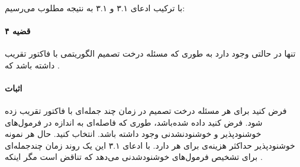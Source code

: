 \documentclass[a4paper]{article}
\begin{document}
	\paragraph{}
	با ترکیب ادعای ۳.۱ و ۳.۱ به نتیجه مطلوب می‌رسیم:
	\paragraph{قضیه ۴}
	تنها در حالتی
	وجود دارد به طوری که مسئله درخت تصمیم الگوریتمی با فاکتور تقریب
	داشته باشد که 
	.
	\paragraph{اثبات}
	فرض کنید برای هر
	مسئله درخت تصمیم در زمان چند جمله‌ای با فاکتور
	تقریب زده شود. فرض کنید
	داده شده‌باشد، طوری که فاصله‌ای به اندازه
	\lr{$\epsilon$}
	در فرمول‌های خوشنودپذیر و خوشنودنشدنی
	وجود داشته باشد. 
	انتخاب کنید. حال هر نمونه خوشنودپذیر حداکثر هزینه‌ی
	برای هر
	دارد. با ادعای ۳.۱ این یک روند زمان چندجمله‌ای برای تشخیص فرمول‌های خوشنودشدنی 
	می‌دهد که تناقض است مگر اینکه
	.
	
	
\end{document}
